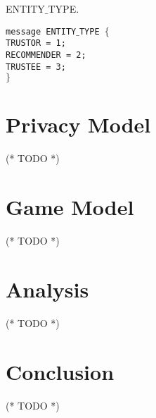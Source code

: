 \documentclass{article}
\begin{document}
ENTITY$\_$TYPE.


\texttt{message ENTITY$\_$TYPE $\{$\\
\hspace*{2.ex} TRUSTOR = 1;\\
\hspace*{2.ex} RECOMMENDER = 2;\\
\hspace*{2.ex} TRUSTEE = 3;\\
$\}$}


\section{Privacy Model}

(* TODO *)


\section{Game Model}

(* TODO *)


\section{Analysis}

(* TODO *)


\section{Conclusion}

(* TODO *)
\end{document}
